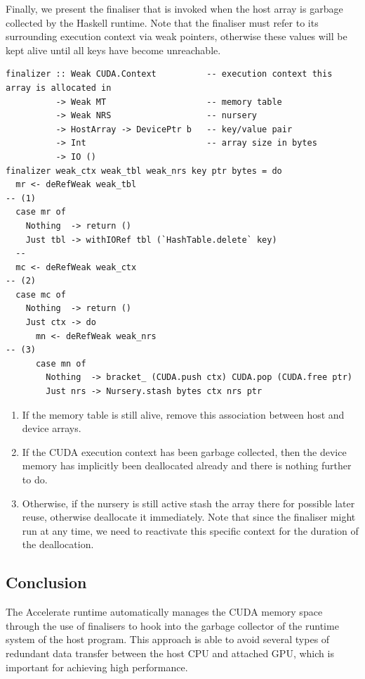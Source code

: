 Finally, we present the finaliser that is invoked when the host array is garbage
collected by the Haskell runtime. Note that the finaliser must refer to its
surrounding execution context via weak pointers, otherwise these values will be
kept alive until all keys have become unreachable.
%
\begin{lstlisting}[style=haskell]
finalizer :: Weak CUDA.Context          -- execution context this array is allocated in
          -> Weak MT                    -- memory table
          -> Weak NRS                   -- nursery
          -> HostArray -> DevicePtr b   -- key/value pair
          -> Int                        -- array size in bytes
          -> IO ()
finalizer weak_ctx weak_tbl weak_nrs key ptr bytes = do
  mr <- deRefWeak weak_tbl                                              -- (1)
  case mr of
    Nothing  -> return ()
    Just tbl -> withIORef tbl (`HashTable.delete` key)
  --
  mc <- deRefWeak weak_ctx                                              -- (2)
  case mc of
    Nothing  -> return ()
    Just ctx -> do
      mn <- deRefWeak weak_nrs                                          -- (3)
      case mn of
        Nothing  -> bracket_ (CUDA.push ctx) CUDA.pop (CUDA.free ptr)
        Just nrs -> Nursery.stash bytes ctx nrs ptr
\end{lstlisting}
%
\begin{enumerate}
\item If the memory table is still alive, remove this association between host
    and device arrays.

\item If the CUDA execution context has been garbage collected, then the
    device memory has implicitly been deallocated already and there is nothing
    further to do.

\item Otherwise, if the nursery is still active stash the array there for
    possible later reuse, otherwise deallocate it immediately. Note that since
    the finaliser might run at any time, we need to reactivate this specific
    context for the duration of the deallocation.
\end{enumerate}


\subsection{Conclusion}
\label{sec:memory_management_conclusion}

The Accelerate runtime automatically manages the CUDA memory space through the
use of finalisers to hook into the garbage collector of the runtime system of
the host program. This approach is able to avoid several types of redundant data
transfer between the host CPU and attached GPU, which is important for
achieving high performance.

